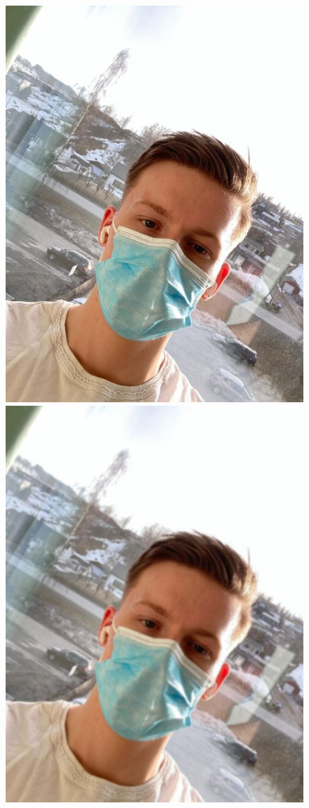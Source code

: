 \begin{figure}[H]
\centering
    \subfloat
        {\includegraphics[scale = 0.13]{figures/0718.jpg}}
    \subfloat
        {\includegraphics[scale = 0.13]{figures/0718blur.jpg}}

\end{figure}
